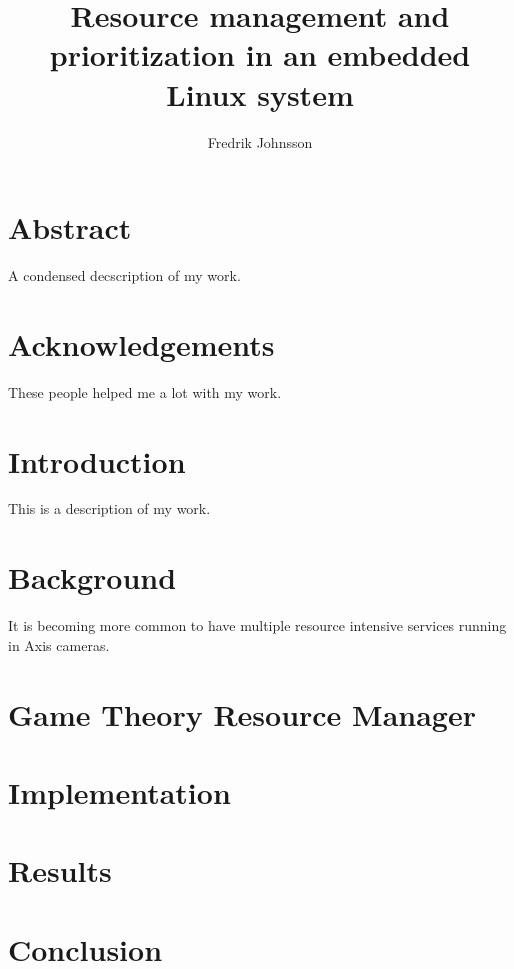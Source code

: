 \documentclass{LTHthesis}
\begin{document}
\begin{titlepages}
\author{Fredrik Johnsson}
\title{Resource management and prioritization in an embedded Linux system}
\end{titlepages}
\setcounter{page}{1}
\chapter*{Abstract}
A condensed decscription of my work.
\chapter*{Acknowledgements}
These people helped me a lot with my work.
\newpage
\tableofcontents
\newpage
\setcounter{page}{1}
\chapter{Introduction}
This is a description of my work.
\chapter{Background}
It is becoming more common to have multiple resource intensive services running in Axis cameras.
\chapter{Game Theory Resource Manager}
\chapter{Implementation}
\chapter{Results}
\chapter{Conclusion}
\printbibliography  %
\end{document}
